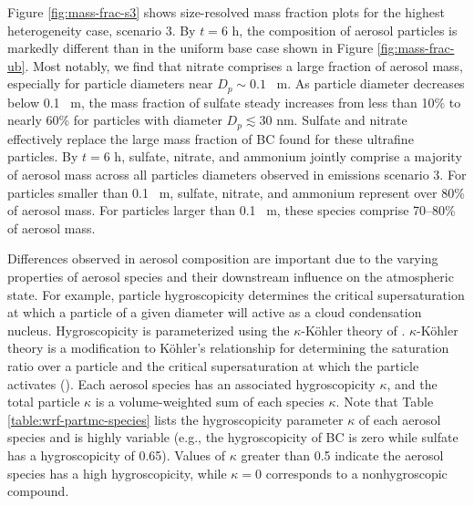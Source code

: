 Figure \ref{fig:mass-frac-s3} shows size-resolved mass fraction plots for the highest heterogeneity case, scenario 3. By $t=6$ h, the composition of aerosol particles is markedly different than in the uniform base case shown in Figure \ref{fig:mass-frac-ub}. Most notably, we find that nitrate comprises a large fraction of aerosol mass, especially for particle diameters near $D_p\sim0.1$ \si{\mu m}. As particle diameter decreases below 0.1 \si{\mu m}, the mass fraction of sulfate steady increases from less than 10\% to nearly 60\% for particles with diameter $D_p  \lesssim 30$ nm. Sulfate and nitrate effectively replace the large mass fraction of BC found for these ultrafine particles. By $t=6$ h, sulfate, nitrate, and ammonium jointly comprise a majority of aerosol mass across all particles diameters observed in emissions scenario 3. For particles smaller than 0.1 \si{\mu m}, sulfate, nitrate, and ammonium represent over 80\% of aerosol mass. For particles larger than 0.1 \si{\mu m}, these species comprise 70--80\% of aerosol mass.

Differences observed in aerosol composition are important due to the varying properties of aerosol species and their downstream influence on the atmospheric state. For example, particle hygroscopicity determines the critical supersaturation at which a particle of a given diameter will active as a cloud condensation nucleus. Hygroscopicity is parameterized using the $\kappa$-Köhler theory of \cite{petters_single_2007}. $\kappa$-Köhler theory is a modification to Köhler's relationship for determining the saturation ratio over a particle and the critical supersaturation at which the particle activates (\cite{kohler_nucleus_1936}). Each aerosol species has an associated hygroscopicity $\kappa$, and the total particle $\kappa$ is a volume-weighted sum of each species $\kappa$. Note that Table \ref{table:wrf-partmc-species} lists the hygroscopicity parameter $\kappa$ of each aerosol species and is highly variable (e.g., the hygroscopicity of BC is zero while sulfate has a hygroscopicity of 0.65). Values of  $\kappa$ greater than 0.5 indicate the aerosol species has a high hygroscopicity, while $\kappa=0$ corresponds to a nonhygroscopic compound.

